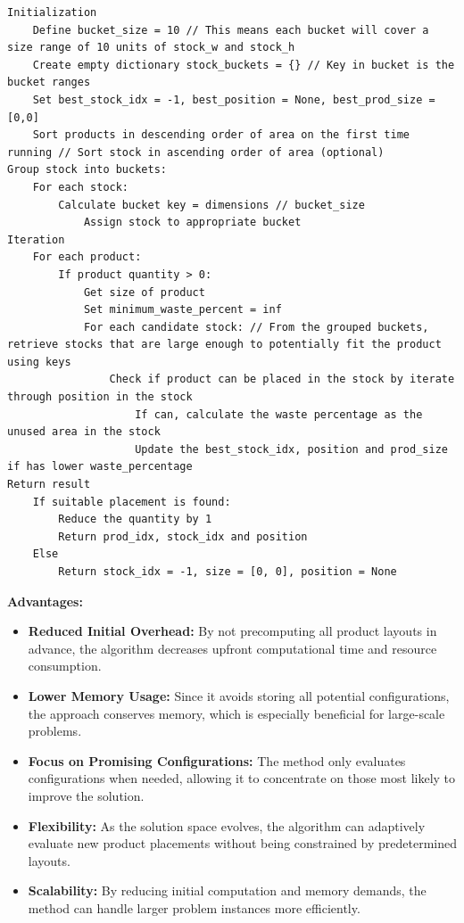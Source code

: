 \documentclass[a4paper]{article}
\begin{document}
\begin{verbatim}
Initialization
    Define bucket_size = 10 // This means each bucket will cover a size range of 10 units of stock_w and stock_h
    Create empty dictionary stock_buckets = {} // Key in bucket is the bucket ranges
    Set best_stock_idx = -1, best_position = None, best_prod_size = [0,0]
    Sort products in descending order of area on the first time running // Sort stock in ascending order of area (optional)
Group stock into buckets:
    For each stock:
        Calculate bucket key = dimensions // bucket_size
            Assign stock to appropriate bucket
Iteration
    For each product:
        If product quantity > 0:
            Get size of product
            Set minimum_waste_percent = inf
            For each candidate stock: // From the grouped buckets, retrieve stocks that are large enough to potentially fit the product using keys
                Check if product can be placed in the stock by iterate through position in the stock
                    If can, calculate the waste percentage as the unused area in the stock
                    Update the best_stock_idx, position and prod_size if has lower waste_percentage
Return result
    If suitable placement is found:
        Reduce the quantity by 1
        Return prod_idx, stock_idx and position
    Else
        Return stock_idx = -1, size = [0, 0], position = None
\end{verbatim}

\noindent\textbf{Advantages:} 
\begin{itemize}
        \item \textbf{Reduced Initial Overhead:} By not precomputing all product layouts in advance, the algorithm decreases upfront computational time and resource consumption.
        \item \textbf{Lower Memory Usage:} Since it avoids storing all potential configurations, the approach conserves memory, which is especially beneficial for large-scale problems.
        \item \textbf{Focus on Promising Configurations:} The method only evaluates configurations when needed, allowing it to concentrate on those most likely to improve the solution.
        \item \textbf{Flexibility:} As the solution space evolves, the algorithm can adaptively evaluate new product placements without being constrained by predetermined layouts.
        \item \textbf{Scalability:} By reducing initial computation and memory demands, the method can handle larger problem instances more efficiently.
    \end{itemize}
\end{document}
